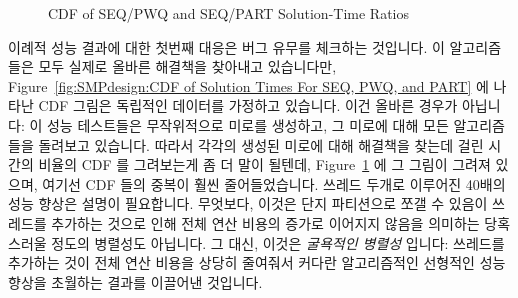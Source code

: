 \begin{figure}[tb]
\centering
{}
\caption{CDF of SEQ/PWQ and SEQ/PART Solution-Time Ratios}
\label{fig:SMPdesign:CDF of SEQ/PWQ and SEQ/PART Solution-Time Ratios}
\end{figure}

이례적 성능 결과에 대한 첫번째 대응은 버그 유무를 체크하는 것입니다.
이 알고리즘들은 모두 실제로 올바른 해결책을 찾아내고 있습니다만,
Figure~\ref{fig:SMPdesign:CDF of Solution Times For SEQ, PWQ, and PART} 에
나타난 CDF 그림은 독립적인 데이터를 가정하고 있습니다.
이건 올바른 경우가 아닙니다:  이 성능 테스트들은 무작위적으로 미로를 생성하고,
그 미로에 대해 모든 알고리즘들을 돌려보고 있습니다.
따라서 각각의 생성된 미로에 대해 해결책을 찾는데 걸린 시간의 비율의 CDF 를
그려보는게 좀 더 말이 될텐데,
Figure~\ref{fig:SMPdesign:CDF of SEQ/PWQ and SEQ/PART Solution-Time Ratios} 에
그 그림이 그려져 있으며, 여기선 CDF 들의 중복이 훨씬 줄어들었습니다.
쓰레드 두개로 이루어진 40배의 성능 향상은 설명이 필요합니다.
무엇보다, 이것은 단지 파티션으로 쪼갤 수 있음이 쓰레드를 추가하는 것으로 인해
전체 연산 비용의 증가로 이어지지 않음을 의미하는 당혹스러울 정도의 병렬성도
아닙니다.
그 대신, 이것은 \emph{굴욕적인 병렬성} 입니다: 쓰레드를 추가하는 것이 전체 연산
비용을 상당히 줄여줘서 커다란 알고리즘적인 선형적인 성능향상을 초월하는 결과를
이끌어낸 것입니다. 
\iffalse

